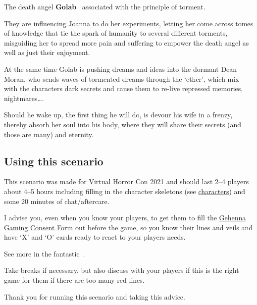 \documentclass[bg-full]{resources/stylesheets/kult}
\begin{document}
The death angel \textbf{Golab}~\cite[p.~215]{KULT:core} associated with the principle of torment.

They are influencing Joanna to do her experiments, letting her come across tomes of knowledge that
tie the spark of humanity to several different torments, misguiding her to spread more pain and
suffering to empower the death angel as well as just their enjoyment.

At the same time Golab is pushing dreams and ideas into the dormant Dean Moran, who sends waves of tormented
dreams through the  ‘ether’, which mix with the characters dark secrets and cause them to re-live repressed memories,
nightmares….

Should he wake up, the first thing he will do, is devour his wife in a frenzy, thereby absorb her soul into his body, where
they will share their secrets (and those are many) and eternity.

\subsection{Using this scenario}%
\label{sub:using_this_scenario}

This scenario was made for Virtual Horror Con 2021 and should last 2--4 players about 4--5 hours including filling in the
character skeletons (see \hyperref[sec:pre_made_characters]{characters}) and some 20 minutes of chat/aftercare.

I advise you, even when you know your players, to get them to fill the
\href{https://www.gehennagaming.com/wp-content/uploads/2020/05/Gehenna-Gaming-Consent-Form.pdf}{Gehenna Gaming Consent Form}
out before the game, so you know their lines and veils and have ‘X’ and ‘O’ cards ready to react to your players needs.

See more in the fantastic~\cite{TTRPG_safety_toolkit}.

Take breaks if necessary, but also discuss with your players if this is the right game for them if there are too many red lines.


Thank you for running this scenario and taking this advice.
\end{document}
